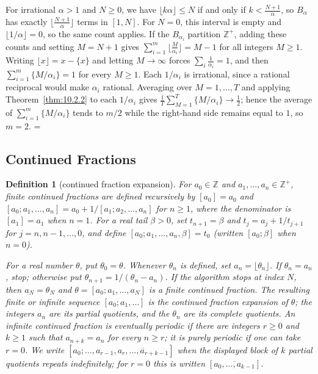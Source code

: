 \documentclass[11pt]{article}
\makeatletter
\let\nt@closedisplay\]
\def\nt@guardedclose{\@ifnextchar\par{\nt@closeafterpar}{\@ifnextchar\end{\postdisplaypenalty\@M\nt@closedisplay}{\nt@closedisplay}}}
\def\nt@closeafterpar\par{\@ifnextchar\par{\nt@closeafterpar}{\@ifnextchar\end{\postdisplaypenalty\@M\nt@closedisplay\par}{\nt@closedisplay\par}}}
\renewenvironment{proof}[1][\proofname]{\par
  \pushQED{\qed}\normalfont\topsep\medskipamount\edef\nt@afterproof{\@endparpenalty=\the\@endparpenalty\relax}\@beginparpenalty\@M\@endparpenalty\@M\let\]\nt@guardedclose\trivlist\item[]\textit{#1\@addpunct{.}} \ignorespaces}{\ifvmode\addpenalty\@M\fi\popQED\nt@afterproof\endtrivlist\@endpefalse}
\theoremstyle{ntstyle}
\newtheorem{definition}{Definition}[subsection]
\makeatother
\begin{document}
\begin{proof} For irrational $\alpha>1$ and $N\ge0$,
  we have $\lfloor k\alpha\rfloor\le N$ if and only if $k<\tfrac{N+1}{\alpha}$, so
  $B_\alpha$ has exactly $\big\lfloor\tfrac{N+1}{\alpha}\big\rfloor$
  terms in $[1,N]$. For $N=0$, this interval is empty and
  $\lfloor1/\alpha\rfloor=0$, so the same count applies.
  If the $B_{\alpha_i}$ partition $\mathbb{Z}^+$,
  adding these counts and setting $M=N+1$ gives
  $\sum_{i=1}^{m}\big\lfloor\tfrac{M}{\alpha_i}\big\rfloor=M-1$ for all
  integers $M\ge1$. Writing $\lfloor x\rfloor=x-\{x\}$ and letting
  $M\to\infty$ forces $\sum_i\tfrac{1}{\alpha_i}=1$, and then
  $\sum_{i=1}^{m}\{M/\alpha_i\}=1$ for every $M\ge1$. Each $1/\alpha_i$ is irrational, since a rational reciprocal
  would make $\alpha_i$ rational. Averaging over $M=1,\ldots,T$ and applying Theorem~\ref{thm:10.2.2} to each
  $1/\alpha_i$ gives $\tfrac{1}{T}\sum_{M=1}^{T}\{M/\alpha_i\}\to\tfrac{1}{2}$;
  hence the average of $\sum_{i=1}^{m}\{M/\alpha_i\}$ tends to $m/2$ while the right-hand side
  remains equal to $1$, so $m=2$.
\end{proof}
\subsection{Continued Fractions}

\begin{definition}[continued fraction expansion]\label{def:10.3.1}\label{def:continued-fraction-expansion}
  For $a_0\in\mathbb{Z}$ and $a_1,\ldots,a_n\in\mathbb{Z}^+$, finite
  continued fractions are defined recursively by $[a_0]=a_0$ and
  $[a_0;a_1,\ldots,a_n]=a_0+1/[a_1;a_2,\ldots,a_n]$ for $n\ge1$,
  where the denominator is $[a_1]=a_1$ when $n=1$.
  For a real tail $\beta>0$, set $t_{n+1}=\beta$ and
  $t_j=a_j+1/t_{j+1}$ for $j=n,n-1,\ldots,0$, and define
  $[a_0;a_1,\ldots,a_n,\beta]=t_0$ (written $[a_0;\beta]$ when $n=0$).

  For a real number $\theta$, put $\theta_0=\theta$. Whenever $\theta_n$ is
  defined, set $a_n=\lfloor\theta_n\rfloor$. If $\theta_n=a_n$, stop;
  otherwise put $\theta_{n+1}=1/(\theta_n-a_n)$. If the algorithm stops
  at index $N$, then $a_N=\theta_N$ and
  $\theta=[a_0;a_1,\ldots,a_N]$ is a finite continued fraction.
  The resulting finite or infinite sequence $[a_0;a_1,\ldots]$ is the
  continued fraction expansion
  of $\theta$; the integers $a_n$ are its partial quotients, and the $\theta_n$ are its complete quotients. An
  infinite continued fraction is
  eventually periodic if there are integers $r\ge0$ and $k\ge1$ such that
  $a_{n+k}=a_n$ for every $n\ge r$; it is purely periodic if one can take
  $r=0$. We write
  $[a_0;\ldots,a_{r-1},\overline{a_r,\ldots,a_{r+k-1}}]$ when the displayed
  block of $k$ partial quotients repeats indefinitely; for $r=0$ this is
  written $[\overline{a_0,\ldots,a_{k-1}}]$.

\end{definition}
\end{document}
